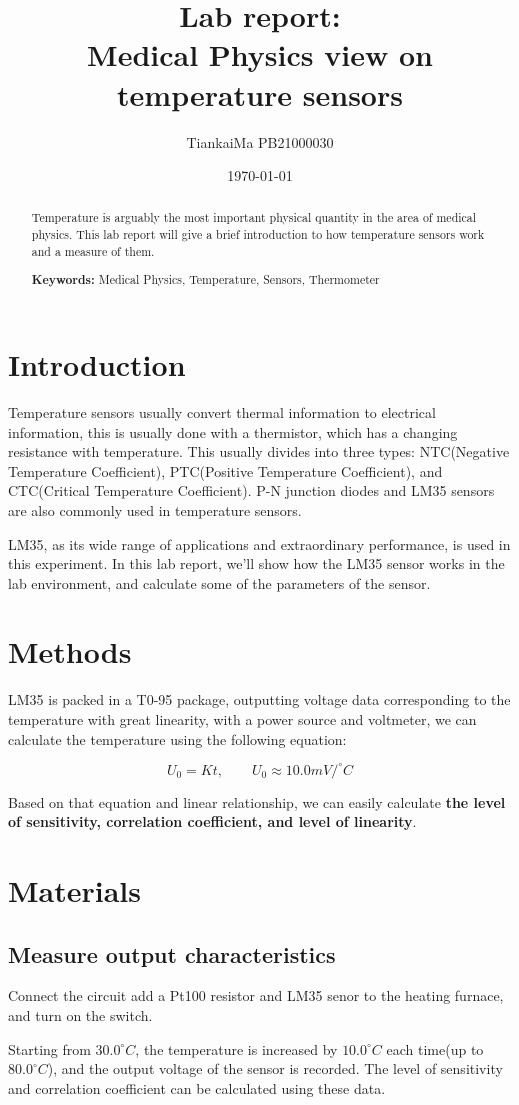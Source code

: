 \documentclass[a4paper]{article}
\title{Lab report:\\ Medical Physics view on temperature sensors}
\author{TiankaiMa PB21000030}
\date{\today}
\begin{document}
\begin{multicols*}{2}
  \maketitle
  \begin{abstract}
    Temperature is arguably the most important physical quantity in the area of medical physics. This lab report will give a brief introduction to how temperature sensors work and a measure of them.
    \par
    \textbf{Keywords:} Medical Physics, Temperature, Sensors, Thermometer
  \end{abstract}
  \section*{Introduction}
  Temperature sensors usually convert thermal information to electrical information, this is usually done with a thermistor, which has a changing resistance with temperature. This usually divides into three types: NTC(Negative Temperature Coefficient), PTC(Positive Temperature Coefficient), and CTC(Critical Temperature Coefficient). P-N junction diodes and LM35 sensors are also commonly used in temperature sensors.

  LM35, as its wide range of applications and extraordinary performance, is used in this experiment. In this lab report, we'll show how the LM35 sensor works in the lab environment, and calculate some of the parameters of the sensor.

  \section*{Methods}

  LM35 is packed in a T0-95 package, outputting voltage data corresponding to the temperature with great linearity, with a power source and voltmeter, we can calculate the temperature using the following equation:

  $$
    U_0 = Kt,\qquad U_0 \approx 10.0 mV/^\circ C
  $$

  Based on that equation and linear relationship, we can easily calculate \textbf{the level of sensitivity, correlation coefficient, and level of linearity}.

  \section*{Materials}
  \subsection*{Measure output characteristics}
  Connect the circuit add a Pt100 resistor and LM35 senor to the heating furnace, and turn on the switch.
  \par
  Starting from $30.0^\circ C$, the temperature is increased by $10.0^\circ C$ each time(up to $80.0^\circ C$), and the output voltage of the sensor is recorded. The level of sensitivity and correlation coefficient can be calculated using these data.


\end{multicols*}
\end{document}
